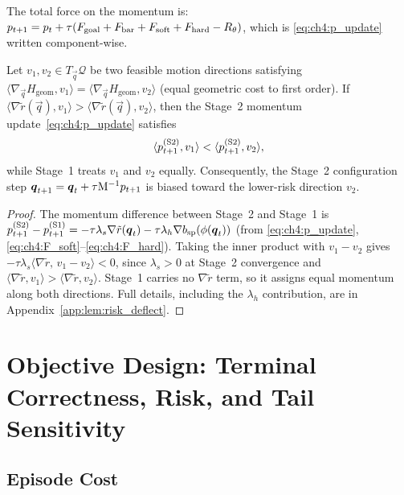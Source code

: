 The total force on the momentum is:
$p_{t+1} = p_t + \tau(F_{\mathrm{goal}} + F_{\mathrm{bar}}
+ F_{\mathrm{soft}} + F_{\mathrm{hard}} - R_\theta)$,
which is \eqref{eq:ch4:p_update} written component-wise.

\begin{lemma}
\label{lem:ch4:risk_deflect}
Let $v_1, v_2 \in T_{\vec{q}}\mathcal{Q}$ be two feasible motion
directions satisfying
$\langle\nabla_{\vec{q}}H_{\mathrm{geom}},v_1\rangle =
 \langle\nabla_{\vec{q}}H_{\mathrm{geom}},v_2\rangle$
(equal geometric cost to first order).
If $\langle\nabla\tilde{r}(\vec{q}),v_1\rangle >
   \langle\nabla\tilde{r}(\vec{q}),v_2\rangle$,
then the Stage~2 momentum update~\eqref{eq:ch4:p_update} satisfies
\[
  \langle p_{t+1}^{(\mathrm{S2})},v_1\rangle <
  \langle p_{t+1}^{(\mathrm{S2})},v_2\rangle,
\]
while Stage~1 treats $v_1$ and $v_2$ equally.
Consequently, the Stage~2 configuration step
$\boldsymbol{q}_{t+1} = \boldsymbol{q}_t + \tau\mathrm{M}^{-1}p_{t+1}$
is biased toward the lower-risk direction $v_2$.
\end{lemma}
\begin{proof}
The momentum difference between Stage~2 and Stage~1 is
$p_{t+1}^{(\mathrm{S2})} - p_{t+1}^{(\mathrm{S1})}
 = -\tau\lambda_s\nabla\tilde{r}(\boldsymbol{q}_t)
   -\tau\lambda_h\nabla b_{\mathrm{sp}}(\phi(\boldsymbol{q}_t))$
(from \eqref{eq:ch4:p_update}, \eqref{eq:ch4:F_soft}--\eqref{eq:ch4:F_hard}).
Taking the inner product with $v_1 - v_2$ gives
$-\tau\lambda_s\langle\nabla\tilde{r},\,v_1-v_2\rangle < 0$,
since $\lambda_s>0$ at Stage~2 convergence and
$\langle\nabla\tilde{r},v_1\rangle>\langle\nabla\tilde{r},v_2\rangle$.
Stage~1 carries no $\nabla\tilde{r}$ term, so it assigns equal
momentum along both directions.
Full details, including the $\lambda_h$ contribution, are in
Appendix~\ref{app:lem:risk_deflect}.
\end{proof}

\section{Objective Design: Terminal Correctness, Risk, and Tail Sensitivity}
\label{sec:ch4:objective}

\subsection{Episode Cost}
\label{subsec:ch4:J}

